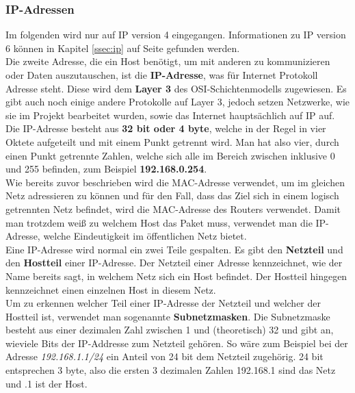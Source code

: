 \documentclass[12pt,a4paper]{report}
\begin{document}
\subsubsection{IP-Adressen}\label{sssec:ipaddr}
Im folgenden wird nur auf IP version 4 eingegangen. Informationen zu IP version 6 können in Kapitel \ref{ssec:ip} auf Seite \pageref{ssec:ip} gefunden werden.\\

Die zweite Adresse, die ein Host benötigt, um mit anderen zu kommunizieren oder Daten auszutauschen, ist die \textbf{IP-Adresse}, was für Internet Protokoll Adresse steht. Diese wird dem \textbf{Layer 3} des OSI-Schichtenmodells zugewiesen. Es gibt auch noch einige andere Protokolle auf Layer 3, jedoch setzen Netzwerke, wie sie im Projekt bearbeitet wurden, sowie das Internet hauptsächlich auf IP auf.\\

Die IP-Adresse besteht aus \textbf{32 bit oder 4 byte}, welche in der Regel in vier Oktete aufgeteilt und mit einem Punkt getrennt wird. Man hat also vier, durch einen Punkt getrennte Zahlen, welche sich alle im Bereich zwischen inklusive 0 und 255 befinden, zum Beispiel \textbf{192.168.0.254}.\\

Wie bereits zuvor beschrieben wird die MAC-Adresse verwendet, um im gleichen Netz adressieren zu können und für den Fall, dass das Ziel sich in einem logisch getrennten Netz befindet, wird die MAC-Adresse des Routers verwendet. Damit man trotzdem weiß zu welchem Host das Paket muss, verwendet man die IP-Adresse, welche Eindeutigkeit im öffentlichen Netz bietet.\\

Eine IP-Adresse wird normal ein zwei Teile gespalten. Es gibt den \textbf{Netzteil} und den \textbf{Hostteil} einer IP-Adresse. Der Netzteil einer Adresse kennzeichnet, wie der Name bereits sagt, in welchem Netz sich ein Host befindet. Der Hostteil hingegen kennzeichnet einen einzelnen Host in diesem Netz.\\
Um zu erkennen welcher Teil einer IP-Adresse der Netzteil und welcher der Hostteil ist, verwendet man sogenannte \textbf{Subnetzmasken}. Die Subnetzmaske besteht aus einer dezimalen Zahl zwischen 1 und (theoretisch) 32 und gibt an, wieviele Bits der IP-Addresse zum Netzteil gehören. So wäre zum Beispiel bei der Adresse \textit{192.168.1.1/24} ein Anteil von 24 bit dem Netzteil zugehörig. 24 bit entsprechen 3 byte, also die ersten 3 dezimalen Zahlen 192.168.1 sind das Netz und .1 ist der Host.
\end{document}
